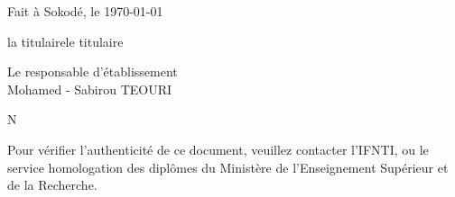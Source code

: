 \documentclass[a4paper, landscape, 10pt]{article}
\begin{document}
Fait à Sokodé, le \today \\

\vspace{0.5cm}


\noindent
\begin{minipage}{0.49\textwidth}
	\begin{center}
		la titulairele titulaire\\
		\vspace{2cm}
		 
	\end{center}
\end{minipage}\hfill
\begin{minipage}{0.49\textwidth}
	\begin{center}
		Le responsable d'établissement\\
		\vspace{2cm}
		Mohamed - Sabirou TEOURI
	\end{center}
\end{minipage}

\vspace{1.5cm}
\noindent
N\textdegree {}


\newpage


\vspace{-10cm}
\begin{center}
	Pour vérifier l’authenticité de ce document, veuillez contacter l’IFNTI,
	ou le service homologation des diplômes du Ministère de l’Enseignement Supérieur et de la Recherche.
\end{center}

\newpage

\end{document}
